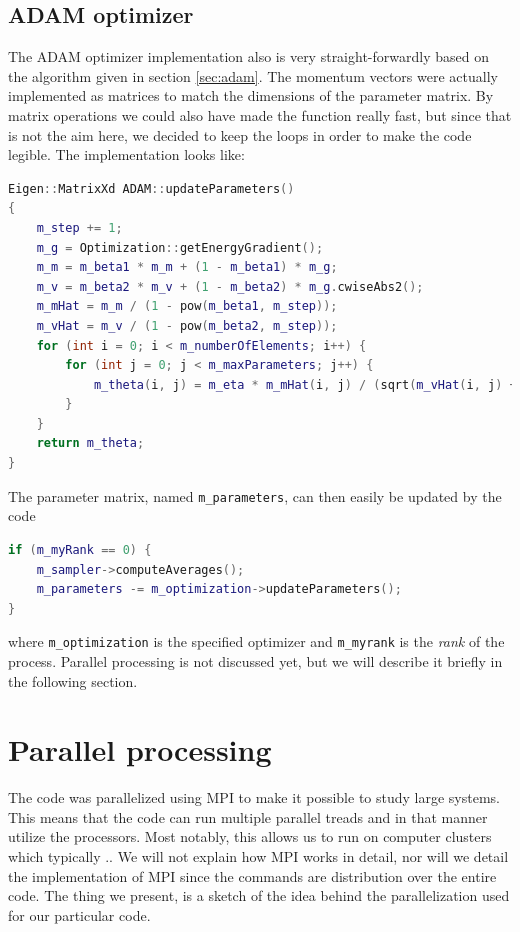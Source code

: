 \subsection{ADAM optimizer}
The ADAM optimizer implementation also is very straight-forwardly based on the algorithm given in section \ref{sec:adam}. The momentum vectors were actually implemented as matrices to match the dimensions of the parameter matrix. By matrix operations we could also have made the function really fast, but since that is not the aim here, we decided to keep the loops in order to make the code legible. The implementation looks like:
\begin{lstlisting}[language=c++,caption={Taken from \lstinline{adam.cpp}.}]
Eigen::MatrixXd ADAM::updateParameters()
{
	m_step += 1;
	m_g = Optimization::getEnergyGradient();
	m_m = m_beta1 * m_m + (1 - m_beta1) * m_g;
	m_v = m_beta2 * m_v + (1 - m_beta2) * m_g.cwiseAbs2();
	m_mHat = m_m / (1 - pow(m_beta1, m_step));
	m_vHat = m_v / (1 - pow(m_beta2, m_step));
	for (int i = 0; i < m_numberOfElements; i++) {
		for (int j = 0; j < m_maxParameters; j++) {
			m_theta(i, j) = m_eta * m_mHat(i, j) / (sqrt(m_vHat(i, j) + m_epsilon));
		}
	}
	return m_theta;
}
\end{lstlisting}

The parameter matrix, named \lstinline|m_parameters|, can then easily be updated by the code
\begin{lstlisting}[language=c++,caption={Taken from \lstinline{system.cpp}.}]
if (m_myRank == 0) {
	m_sampler->computeAverages();
	m_parameters -= m_optimization->updateParameters();
}
\end{lstlisting}
where \lstinline|m_optimization| is the specified optimizer and \lstinline|m_myrank| is the \textit{rank} of the process. Parallel processing is not discussed yet, but we will describe it briefly in the following section.

\section{Parallel processing}
The code was parallelized using MPI to make it possible to study large systems. This means that the code can run multiple parallel treads and in that manner utilize the processors. Most notably, this allows us to run on computer clusters which typically .. We will not explain how MPI works in detail, nor will we detail the implementation of MPI since the commands are distribution over the entire code. The thing we present, is a sketch of the idea behind the parallelization used for our particular code.

